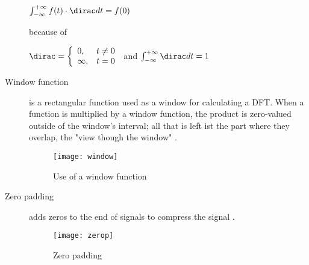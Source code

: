 \begin{description}
	$\int_{-\infty}^{+\infty} f(t) \cdot \dirac dt = f(0) $ 
	
	because of 
		
	$ \dirac=\left\{\begin{array}{ll} 0, & t \neq 0 \\
	\infty, & t = 0\end{array}\right. $	and $\int_{-\infty}^{+\infty}\dirac dt = 1 $
	
	\item[Window function] is a rectangular function used as a window for calculating a DFT. When a function is multiplied by a window function, the product is zero-valued outside of the window's interval; all that is left ist the part where they overlap, the "view though the window" .
		\begin{figure}[!h]
			\centering
			\texttt{[image: window]}
			\caption{Use of a window function}
			\label{fig:window}
		\end{figure}
	
	\item[Zero padding] adds zeros to the end of signals to compress the signal .
		\begin{figure}[!h]
			\centering
			\texttt{[image: zerop]}
			\caption{Zero padding}
			\label{fig:zerop}
		\end{figure}


	
\end{description}
